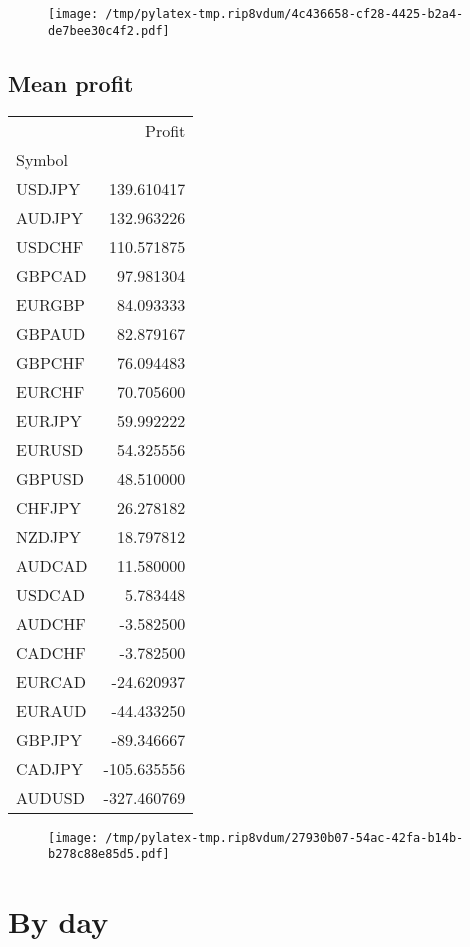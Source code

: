 \documentclass{article}%
\begin{document}
\begin{figure}[htbp]%
\centering%
\texttt{[image: /tmp/pylatex-tmp.rip8vdum/4c436658-cf28-4425-b2a4-de7bee30c4f2.pdf]}%
\end{figure}

%
\newpage %
\subsection{Mean profit }%
\label{subsec:Meanprofit}%
\begin{tabular}{lr}
\toprule
{} &      Profit \\
Symbol &             \\
\midrule
USDJPY &  139.610417 \\
AUDJPY &  132.963226 \\
USDCHF &  110.571875 \\
GBPCAD &   97.981304 \\
EURGBP &   84.093333 \\
GBPAUD &   82.879167 \\
GBPCHF &   76.094483 \\
EURCHF &   70.705600 \\
EURJPY &   59.992222 \\
EURUSD &   54.325556 \\
GBPUSD &   48.510000 \\
CHFJPY &   26.278182 \\
NZDJPY &   18.797812 \\
AUDCAD &   11.580000 \\
USDCAD &    5.783448 \\
AUDCHF &   -3.582500 \\
CADCHF &   -3.782500 \\
EURCAD &  -24.620937 \\
EURAUD &  -44.433250 \\
GBPJPY &  -89.346667 \\
CADJPY & -105.635556 \\
AUDUSD & -327.460769 \\
\bottomrule
\end{tabular}
%


\begin{figure}[htbp]%
\centering%
\texttt{[image: /tmp/pylatex-tmp.rip8vdum/27930b07-54ac-42fa-b14b-b278c88e85d5.pdf]}%
\end{figure}

%
\newpage %
\section{By day}%
\label{sec:Byday}%
\end{document}
